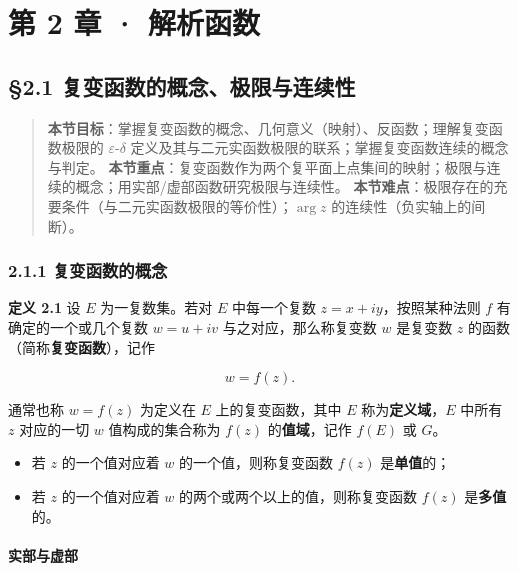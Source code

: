 \chapter{第 2 章 ·
解析函数}\label{ux7b2c-2-ux7ae0-ux89e3ux6790ux51fdux6570}

\section{§2.1
复变函数的概念、极限与连续性}\label{ux590dux53d8ux51fdux6570ux7684ux6982ux5ff5ux6781ux9650ux4e0eux8fdeux7eedux6027}

\begin{quote}
\textbf{本节目标}：掌握复变函数的概念、几何意义（映射）、反函数；理解复变函数极限的
\(\varepsilon\)-\(\delta\)
定义及其与二元实函数极限的联系；掌握复变函数连续的概念与判定。
\textbf{本节重点}：复变函数作为两个复平面上点集间的映射；极限与连续的概念；用实部/虚部函数研究极限与连续性。
\textbf{本节难点}：极限存在的充要条件（与二元实函数极限的等价性）；\(\arg z\)
的连续性（负实轴上的间断）。
\end{quote}

\subsection{2.1.1
复变函数的概念}\label{ux590dux53d8ux51fdux6570ux7684ux6982ux5ff5}

\textbf{定义 2.1} 设 \(E\) 为一复数集。若对 \(E\) 中每一个复数
\(z=x+iy\)，按照某种法则 \(f\) 有确定的一个或几个复数 \(w=u+iv\)
与之对应，那么称复变数 \(w\) 是复变数 \(z\)
的函数（简称\textbf{复变函数}），记作

\[
w=f(z).
\]

通常也称 \(w=f(z)\) 为定义在 \(E\) 上的复变函数，其中 \(E\)
称为\textbf{定义域}，\(E\) 中所有 \(z\) 对应的一切 \(w\)
值构成的集合称为 \(f(z)\) 的\textbf{值域}，记作 \(f(E)\) 或 \(G\)。

\begin{itemize}
\tightlist
\item
  若 \(z\) 的一个值对应着 \(w\) 的一个值，则称复变函数 \(f(z)\)
  是\textbf{单值}的；
\item
  若 \(z\) 的一个值对应着 \(w\) 的两个或两个以上的值，则称复变函数
  \(f(z)\) 是\textbf{多值}的。
\end{itemize}

\subsubsection{实部与虚部}\label{ux5b9eux90e8ux4e0eux865aux90e8}

